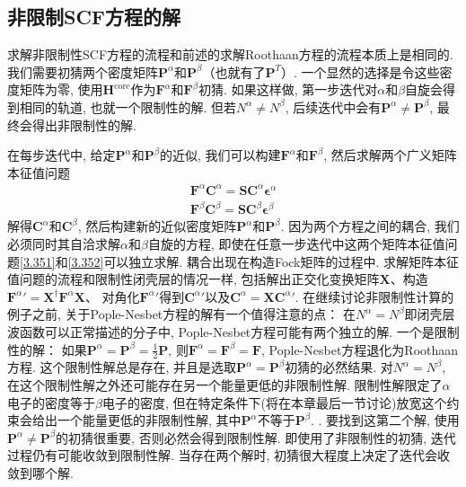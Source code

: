 \subsection{非限制SCF方程的解}
求解非限制性SCF方程的流程和前述的求解Roothaan方程的流程本质上是相同的. 
我们需要初猜两个密度矩阵$\mathbf{P}^\alpha$和$\mathbf{P}^\beta$（也就有了$\mathbf{P}^T$）. 
一个显然的选择是令这些密度矩阵为零, 使用$\mathbf{H}^\text{core}$作为$\mathbf{F}^\alpha$和$\mathbf{F}^\beta$初猜. 
如果这样做, 第一步迭代对$\alpha$和$\beta$自旋会得到相同的轨道, 也就一个限制性的解. 
但若$N^\alpha\neq N^\beta$, 后续迭代中会有$\mathbf{P}^\alpha\neq\mathbf{P}^\beta$, 最终会得出非限制性的解. 

在每步迭代中, 给定$\mathbf{P}^\alpha$和$\mathbf{P}^\beta$的近似, 我们可以构建$\mathbf{F}^\alpha$和$\mathbf{F}^\beta$, 然后求解两个广义矩阵本征值问题
\begin{align}
	\mathbf{F}^\alpha\mathbf{C}^\alpha = \mathbf{S}\mathbf{C}^\alpha\bm{\epsilon}^\alpha \label{3.351}\\
	\mathbf{F}^\beta\mathbf{C}^\beta = \mathbf{S}\mathbf{C}^\beta\bm{\epsilon}^\beta \label{3.352}
\end{align}
解得$\mathbf{C}^\alpha$和$\mathbf{C}^\beta$, 然后构建新的近似密度矩阵$\mathbf{P}^\alpha$和$\mathbf{P}^\beta$. 
因为两个方程之间的耦合, 我们必须同时其自洽求解$\alpha$和$\beta$自旋的方程, 即使在任意一步迭代中这两个矩阵本征值问题\autoref{3.351}和\autoref{3.352}可以独立求解. 耦合出现在构造Fock矩阵的过程中. 
求解矩阵本征值问题的流程和限制性闭壳层的情况一样, 包括解出正交化变换矩阵$\mathbf{X}$、构造${\mathbf{F}^\alpha}'=\mathbf{X}^\dagger \mathbf{F}^\alpha\mathbf{X}$、
对角化${\mathbf{F}^\alpha}'$得到${\mathbf{C}^\alpha}'$以及$\mathbf{C}^\alpha=\mathbf{X}{\mathbf{C}^\alpha}'$. 
在继续讨论非限制性计算的例子之前,
关于Pople-Nesbet方程的解有一个值得注意的点：
在$N^\alpha=N^\beta$即闭壳层波函数可以正常描述的分子中,
Pople-Nesbet方程可能有两个独立的解. 
一个是限制性的解：
如果$\mathbf{P}^\alpha=\mathbf{P}^\beta=\frac{1}{2}\mathbf{P}$,
则$\mathbf{F}^\alpha=\mathbf{F}^\beta=\mathbf{F}$,
Pople-Nesbet方程退化为Roothaan方程. 
这个限制性解总是存在, 并且是选取$\mathbf{P}^\alpha=\mathbf{P}^\beta$初猜的必然结果. 
对$N^\alpha=N^\beta$,
在这个限制性解之外还可能存在另一个能量更低的非限制性解.
限制性解限定了$\alpha$电子的密度等于$\beta$电子的密度, 
但在特定条件下(将在本章最后一节讨论)放宽这个约束会给出一个能量更低的非限制性解,
其中$\mathbf{P}^\alpha$不等于$\mathbf{P}^\beta$. 
. 
要找到这第二个解,
使用$\mathbf{P}^\alpha\neq\mathbf{P}^\beta$的初猜很重要,
否则必然会得到限制性解. 
即使用了非限制性的初猜, 迭代过程仍有可能收敛到限制性解.
当存在两个解时, 初猜很大程度上决定了迭代会收敛到哪个解. 

